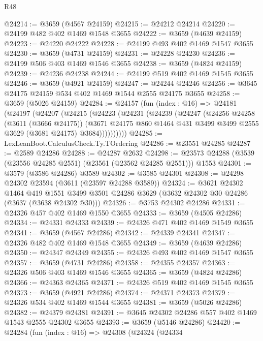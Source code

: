 \begin{lexlean}{R48}
\begin{coremodule}
@24214 := @3659 (@4567 @24159)
@24215 := @24212 @24214
@24220 := @24199 @482 @402 @1469 @1548 @3655
@24222 := @3659 (@4639 @24159)
@24223 := @24220 @24222
@24228 := @24199 @493 @402 @1469 @1547 @3655
@24230 := @3659 (@4731 @24159)
@24231 := @24228 @24230
@24236 := @24199 @506 @403 @1469 @1546 @3655
@24238 := @3659 (@4824 @24159)
@24239 := @24236 @24238
@24244 := @24199 @519 @402 @1469 @1545 @3655
@24246 := @3659 (@4921 @24159)
@24247 := @24244 @24246
@24256 := @3645 @24175 @24159 @534 @402 @1469 @1544 @2555 @24175 @3655
@24258 := @3659 (@5026 @24159)
@24284 := @24157
    (fun (index : @16) =>
    @24181
      (@24197
        (@24207
          (@24215
            (@24223
              (@24231
                (@24239
                  (@24247
                    (@24256
                      @24258
                      (@3611 (@3666 @24175))
                      (@3671
                        @24175
                        @860
                        @1464
                        @431
                        @3499
                        @3499
                        @2555
                        @3629
                        (@3681 @24175)
                        @3684))))))))))
@24285 := LexLeanBoot.CalculusCheck.Ty.TOrdering
@24286 := @23551 @24285
@24287 := @2589 @24286
@24288 := @24287 @2632
@24298 := @23573 @24288 (@3539 (@23556 @24285 @2551) (@23561 (@23562 @24285 @2551))) @1553
@24301 := @3579 (@3586 @24286) @3589
@24302 := @3585 @24301
@24308 := @24298 @24302 @23594 (@3611 (@23597 @24288 @3589))
@24324 := @3621
    @24302
    @1464
    @419
    @1551
    @3499
    @3501
    @24286
    @3629
    (@3632 @24302 @30 @24286 (@3637 (@3638 @24302 @30)))
@24326 := @3753 @24302 @24286
@24331 := @24326 @457 @402 @1469 @1550 @3655
@24333 := @3659 (@4505 @24286)
@24334 := @24331 @24333
@24339 := @24326 @471 @402 @1469 @1549 @3655
@24341 := @3659 (@4567 @24286)
@24342 := @24339 @24341
@24347 := @24326 @482 @402 @1469 @1548 @3655
@24349 := @3659 (@4639 @24286)
@24350 := @24347 @24349
@24355 := @24326 @493 @402 @1469 @1547 @3655
@24357 := @3659 (@4731 @24286)
@24358 := @24355 @24357
@24363 := @24326 @506 @403 @1469 @1546 @3655
@24365 := @3659 (@4824 @24286)
@24366 := @24363 @24365
@24371 := @24326 @519 @402 @1469 @1545 @3655
@24373 := @3659 (@4921 @24286)
@24374 := @24371 @24373
@24379 := @24326 @534 @402 @1469 @1544 @3655
@24381 := @3659 (@5026 @24286)
@24382 := @24379 @24381
@24391 := @3645 @24302 @24286 @557 @402 @1469 @1543 @2555 @24302 @3655
@24393 := @3659 (@5146 @24286)
@24420 := @24284
    (fun (index : @16) =>
    @24308
      (@24324
        (@24334

\end{coremodule}
\end{lexlean}
